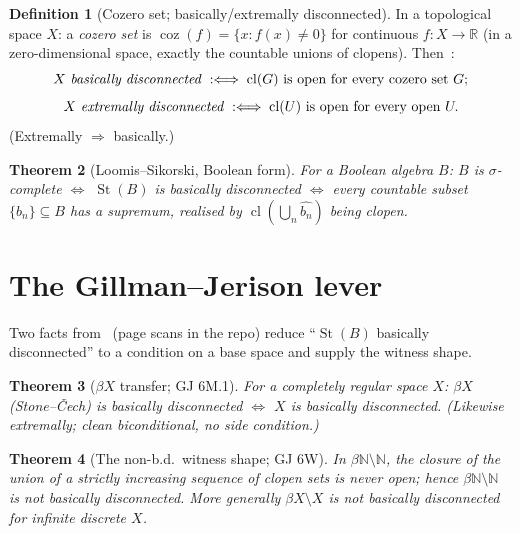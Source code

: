 \documentclass[11pt]{article}
\newtheorem{theorem}{Theorem}[section]
\theoremstyle{definition}
\newtheorem{definition}[theorem]{Definition}
\theoremstyle{remark}
\newcommand{\St}{\operatorname{St}}
\newcommand{\coz}{\operatorname{coz}}
\newcommand{\cl}{\operatorname{cl}}
\begin{document}
\begin{definition}[Cozero set; basically/extremally disconnected]\label{def:bd}
In a topological space $X$: a \emph{cozero set} is $\coz(f)=\{x:f(x)\neq0\}$ for
continuous $f\colon X\to\mathbb R$ (in a zero-dimensional space, exactly the
countable unions of clopens). Then~\cite[1H]{GJ}:
\[
  X \text{ \emph{basically disconnected}} \;:\Longleftrightarrow\;
  \cl(G)\text{ is open for every cozero set }G;
\]
\[
  X \text{ \emph{extremally disconnected}} \;:\Longleftrightarrow\;
  \cl(U)\text{ is open for every open }U.
\]
(Extremally $\Rightarrow$ basically.)
\end{definition}

\begin{theorem}[Loomis--Sikorski, Boolean form]\label{thm:ls}
For a Boolean algebra $B$: $B$ is $\sigma$-complete $\iff$ $\St(B)$ is basically
disconnected $\iff$ every countable subset $\{b_n\}\subseteq B$ has a supremum,
realised by $\cl(\bigcup_n\widehat{b_n})$ being clopen.
\end{theorem}

\section{The Gillman--Jerison lever}\label{sec:gj}

Two facts from~\cite{GJ} (page scans in the repo) reduce ``$\St(B)$ basically
disconnected'' to a condition on a base space and supply the witness shape.

\begin{theorem}[$\beta X$ transfer; GJ 6M.1]\label{thm:6M}
For a completely regular space $X$: $\beta X$ (Stone--\v Cech) is basically
disconnected $\iff$ $X$ is basically disconnected. (Likewise extremally; clean
biconditional, no side condition.)
\end{theorem}

\begin{theorem}[The non-b.d.\ witness shape; GJ 6W]\label{thm:6W}
In $\beta\mathbb N\setminus\mathbb N$, the closure of the union of a
\emph{strictly increasing} sequence of clopen sets is never open; hence
$\beta\mathbb N\setminus\mathbb N$ is not basically disconnected. More generally
$\beta X\setminus X$ is not basically disconnected for infinite discrete $X$.
\end{theorem}
\end{document}
